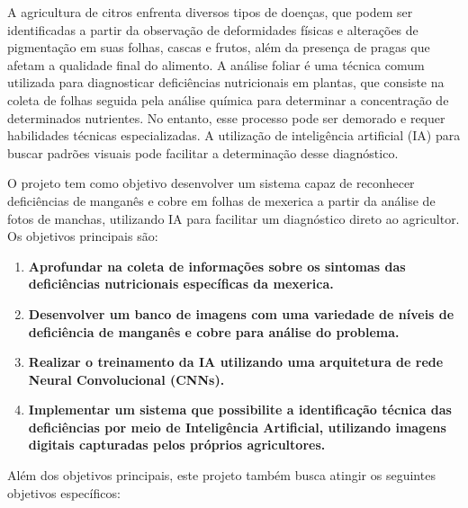 A agricultura de citros enfrenta diversos tipos de doenças, que podem ser identificadas a partir da observação de deformidades físicas e alterações de pigmentação em suas folhas, cascas e frutos, além da presença de pragas que afetam a qualidade final do alimento. A análise foliar é uma técnica comum utilizada para diagnosticar deficiências nutricionais em plantas, que consiste na coleta de folhas seguida pela análise química para determinar a concentração de determinados nutrientes. No entanto, esse processo pode ser demorado e requer habilidades técnicas especializadas. A utilização de inteligência artificial (IA) para buscar padrões visuais pode facilitar a determinação desse diagnóstico.

O projeto tem como objetivo desenvolver um sistema capaz de reconhecer deficiências de manganês e cobre em folhas de mexerica a partir da análise de fotos de manchas, utilizando IA para facilitar um diagnóstico direto ao agricultor. Os objetivos principais são:
\begin{enumerate} 
\item \textbf{Aprofundar na coleta de informações sobre os sintomas das deficiências nutricionais específicas da mexerica.} 
\item \textbf{Desenvolver um banco de imagens com uma variedade de níveis de deficiência de manganês e cobre para análise do problema.} \item \textbf{Realizar o treinamento da IA utilizando uma arquitetura de rede Neural Convolucional (CNNs).} 
\item \textbf{Implementar um sistema que possibilite a identificação técnica das deficiências por meio de Inteligência Artificial, utilizando imagens digitais capturadas pelos próprios agricultores.} 
\end{enumerate}

Além dos objetivos principais, este projeto também busca atingir os seguintes objetivos específicos:

